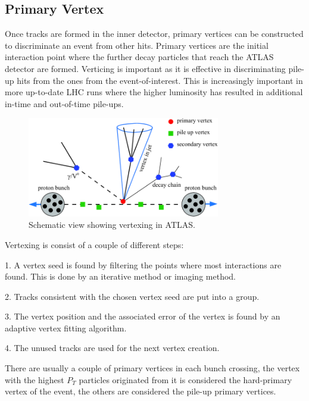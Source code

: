 \subsection*{Primary Vertex}
Once tracks are formed in the inner detector, primary vertices can be constructed to discriminate an event from other hits. 
Primary vertices are the initial interaction point where the further decay particles that reach the ATLAS detector are formed. Verticing is important as it is effective in discriminating pile-up hits from the ones from the event-of-interest. This is increasingly important in more up-to-date LHC runs where the higher luminosity has resulted in additional in-time and out-of-time pile-ups. 

\begin{figure}[!htb]
    \begin{center}
        \includegraphics[width=0.75\textwidth]{figures/common_ana/Vertex}
        \caption{        
            Schematic view showing vertexing in ATLAS\cite{4774734}.
        }
    \end{center}
\end{figure}

Vertexing is consist of a couple of different steps:

1. A vertex seed is found by filtering the points where most interactions are found. This is done by an iterative method or imaging method.  

2. Tracks consistent with the chosen vertex seed are put into a group.

3. The vertex position and the associated error of the vertex is found by an adaptive vertex fitting algorithm.

4. The unused tracks are used for the next vertex creation. 

There are usually a couple of primary vertices in each bunch crossing, the vertex with the highest $P_{T}$ particles originated from it is considered the hard-primary vertex of the event, the others are considered the pile-up primary vertices. 

